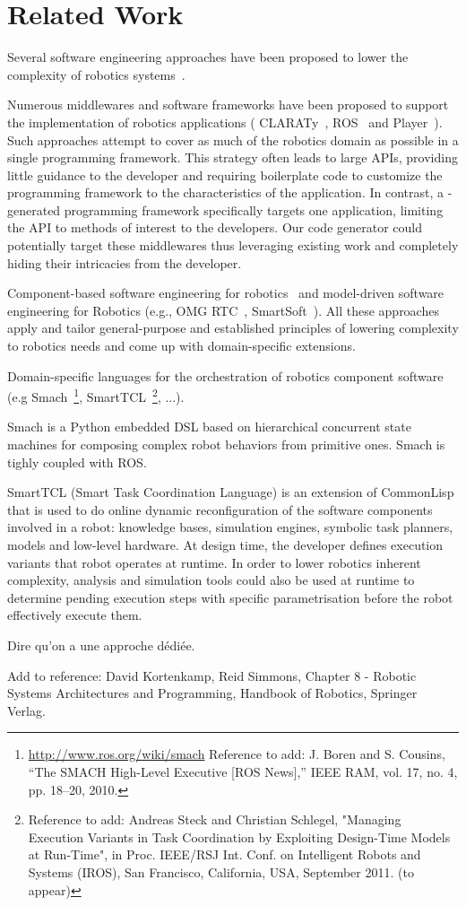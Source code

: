 
\section{Related Work}
\label{sec:related}

Several software engineering approaches have been proposed to lower
the complexity of robotics systems~\cite{Brug07a}.

Numerous middlewares and software frameworks have been proposed to
support the implementation of robotics applications (\eg{}
CLARATy~\cite{Claraty}, ROS~\cite{ROS} and Player~\cite{Coll05a}).
Such approaches attempt to cover as much of the robotics domain as
possible in a single programming framework. This strategy often leads
to large APIs, providing little guidance to the developer and
requiring boilerplate code to customize the programming framework to
the characteristics of the application. In contrast, a
\diaspec{}-generated programming framework specifically targets one
application, limiting the API to methods of interest to the
developers. Our code generator could potentially target these
middlewares thus leveraging existing work and completely hiding their
intricacies from the developer.

Component-based software engineering for robotics~\cite{Brug07b} and
model-driven software engineering for Robotics (e.g., OMG
RTC~\cite{OMGRTC}, SmartSoft~\cite{Schl09a}). All these approaches
apply and tailor general-purpose and established principles of
lowering complexity to robotics needs and come up with domain-specific
extensions.

Domain-specific languages for the orchestration of robotics component software (e.g Smach~\footnote{\url{http://www.ros.org/wiki/smach} Reference to add: J. Boren and S. Cousins, “The SMACH High-Level Executive [ROS News],” IEEE RAM, vol. 17, no. 4, pp. 18–20, 2010. }, SmartTCL~\footnote{Reference to add: Andreas Steck and Christian Schlegel, "Managing Execution Variants in Task Coordination by Exploiting Design-Time Models at Run-Time", in Proc. IEEE/RSJ Int. Conf. on Intelligent Robots and Systems (IROS), San Francisco, California, USA, September 2011. (to appear)}, ...).

Smach is a Python embedded DSL based on hierarchical concurrent state machines for composing complex robot behaviors from primitive ones. Smach is tighly coupled with ROS.

SmartTCL (Smart Task Coordination Language) is an extension of CommonLisp that is used to do online dynamic reconfiguration of the software components involved in a robot: knowledge bases, simulation engines, symbolic task planners, models and low-level hardware. At design time, the developer defines execution variants that robot operates at runtime. In order to lower robotics inherent complexity, analysis and simulation tools could also be used at runtime to determine pending execution steps with specific parametrisation before the robot effectively execute them.

Dire qu'on a une approche dédiée.

Add to reference: David Kortenkamp, Reid Simmons, Chapter 8 - Robotic Systems Architectures and Programming, Handbook of Robotics, Springer Verlag.
